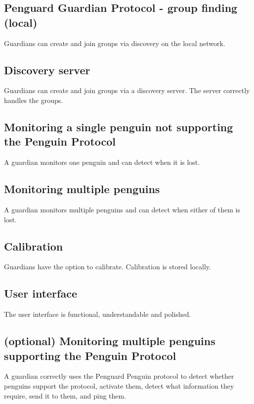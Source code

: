 \documentclass{report}
\begin{document}
\subsection{Penguard Guardian Protocol - group finding (local)}

Guardians can create and join groups via discovery on the local network.

\subsection{Discovery server}

Guardians can create and join groups via a discovery server. The server correctly handles the groups.

\subsection{Monitoring a single penguin not supporting the Penguin Protocol}

A guardian monitors one penguin and can detect when it is lost. 

\subsection{Monitoring multiple penguins}

A guardian monitors multiple penguins and can detect when either of them is lost. 

\subsection{Calibration}

Guardians have the option to calibrate. Calibration is stored locally.

\subsection{User interface}

The user interface is functional, understandable and polished.

\subsection{(optional) Monitoring multiple penguins supporting the Penguin Protocol}

A guardian correctly uses the Penguard Penguin protocol to detect whether penguins support the protocol, activate them, detect what information they require, send it to them, and ping them.
\end{document}
